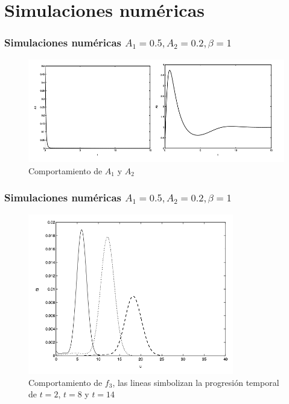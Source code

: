 \documentclass{beamer}
\begin{document}
\section{Simulaciones numéricas}

\begin{frame}
	\frametitle{Simulaciones numéricas $A_1 = 0.5, A_2 = 0.2, \beta = 1$}
	\begin{figure}
		\centering
		\includegraphics[width=1\textwidth]{test2A1A2.png}
		\caption{Comportamiento de $A_1$ y $A_2$ }
		\label{fig:ejemplo2}
	\end{figure}
\end{frame}
\begin{frame}
	\frametitle{Simulaciones numéricas $A_1 = 0.5, A_2 = 0.2, \beta = 1$}
	\begin{figure}
		\centering
		\includegraphics[width=0.8\textwidth]{test2F3.png}
		\caption{Comportamiento de $f_3$, las lineas simbolizan la progresión temporal de $t=2$, $t=8$ y $t=14$ }
		\label{fig:ejemplo3}
	\end{figure}
\end{frame}
\end{document}
